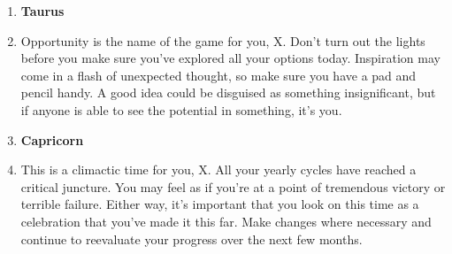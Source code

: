 \documentclass{article}[twocolumn]
\newcommand{\bb}[1]{\item[] \textbf{#1}}
\begin{document}
\begin{multicols}{2}
\begin{enumerate}
 \bb{Taurus}
\item Opportunity is the name of the game for you, X. Don't turn out the lights before you make sure you've explored all your options today. Inspiration may come in a flash of unexpected thought, so make sure you have a pad and pencil handy. A good idea could be disguised as something insignificant, but if anyone is able to see the potential in something, it's you.\\ 
 \bb{Capricorn}
\item This is a climactic time for you, X. All your yearly cycles have reached a critical juncture. You may feel as if you're at a point of tremendous victory or terrible failure. Either way, it's important that you look on this time as a celebration that you've made it this far. Make changes where necessary and continue to reevaluate your progress over the next few months.\\ 
\end{enumerate}

\end{multicols}
\end{document}
